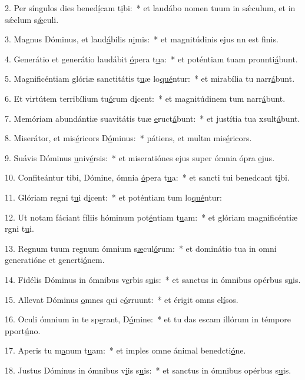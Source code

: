 2. Per síngulos dies bened\uline{í}cam t\uline{i}bi:~* et laudábo nomen tuum in sǽculum, et in sǽclum s\uline{ǽ}culi.\par 
3. Magnus Dóminus, et laud\uline{á}bilis n\uline{i}mis:~* et magnitúdinis ejus nn est f\uline{i}nis.\par 
4. Generátio et generátio laudábit \uline{ó}pera t\uline{u}a:~* et poténtiam tuam pronnti\uline{á}bunt.\par 
5. Magnificéntiam glóriæ sanctitátis t\uline{u}æ lo\uline{qué}ntur:~* et mirabília tu narr\uline{á}bunt.\par 
6. Et virtútem terribílium tu\uline{ó}rum d\uline{i}cent:~* et magnitúdinem tum narr\uline{á}bunt.\par 
7. Memóriam abundántiæ suavitátis tuæ \uline{e}ruct\uline{á}bunt:~* et justítia tua xsult\uline{á}bunt.\par 
8. Miserátor, et mis\uline{é}ricors D\uline{ó}minus:~* pátiens, et multm mis\uline{é}ricors.\par 
9. Suávis Dóminus \uline{u}niv\uline{é}rsis:~* et miseratiónes ejus super ómnia ópra \uline{e}jus.\par 
10. Confiteántur tibi, Dómine, ómnia \uline{ó}pera t\uline{u}a:~* et sancti tui benedcant t\uline{i}bi.\par 
11. Glóriam regni t\uline{u}i d\uline{i}cent:~* et poténtiam tum lo\uline{qué}ntur:\par 
12. Ut notam fáciant fíliis hóminum pot\uline{é}ntiam t\uline{u}am:~* et glóriam magnificéntiæ rgni t\uline{u}i.\par 
13. Regnum tuum regnum ómnium s\uline{æ}cul\uline{ó}rum:~* et dominátio tua in omni generatióne et generti\uline{ó}nem.\par 
14. Fidélis Dóminus in ómnibus v\uline{e}rbis s\uline{u}is:~* et sanctus in ómnibus opérbus s\uline{u}is.\par 
15. Allevat Dóminus \uline{o}mnes qui c\uline{ó}rruunt:~* et érigit omns el\uline{í}sos.\par 
16. Oculi ómnium in te sp\uline{e}rant, D\uline{ó}mine:~* et tu das escam illórum in témpore pport\uline{ú}no.\par 
17. Aperis tu m\uline{a}num t\uline{u}am:~* et imples omne ánimal benedcti\uline{ó}ne.\par 
18. Justus Dóminus in ómnibus v\uline{i}is s\uline{u}is:~* et sanctus in ómnibus opérbus s\uline{u}is.\par 
